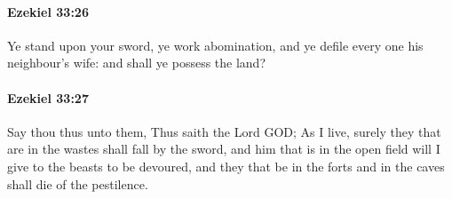 		\paragraph{Ezekiel 33:26} %
			\label{EZEKIEL-33-26}

			Ye stand upon your sword, ye work abomination, and ye defile every one his neighbour’s wife: and shall ye possess the land?


		\paragraph{Ezekiel 33:27} %
			\label{EZEKIEL-33-27}

			Say thou thus unto them, Thus saith the Lord GOD; As I live, surely they that are in the wastes shall fall by the sword, and him that is in the open field will I give to the beasts to be devoured, and they that be in the forts and in the caves shall die of the pestilence.

